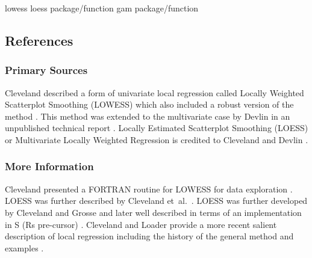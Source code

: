 lowess
loess package/function
gam package/function

\subsection{References}

\subsubsection{Primary Sources}
Cleveland described a form of univariate local regression called Locally Weighted Scatterplot Smoothing (LOWESS) which also included a robust version of the method \cite{Cleveland1978, Cleveland1979}. 
This method was extended to the multivariate case by Devlin in an unpublished technical report \cite{Devlin1986}.
Locally Estimated Scatterplot Smoothing (LOESS) or Multivariate Locally Weighted Regression is credited to Cleveland and Devlin \cite{Cleveland1988}.

\subsubsection{More Information}
Cleveland presented a FORTRAN routine for LOWESS for data exploration \cite{Cleveland1981}.
LOESS was further described by Cleveland et~al.\ \cite{Cleveland1988a}.
LOESS was further developed by Cleveland and Grosse \cite{Cleveland1991} and later well described in terms of an implementation in S (Rs pre-cursor) \cite{Cleveland1992}.
Cleveland and Loader provide a more recent salient description of local regression including the history of the general method and examples \cite{Cleveland1996}.

